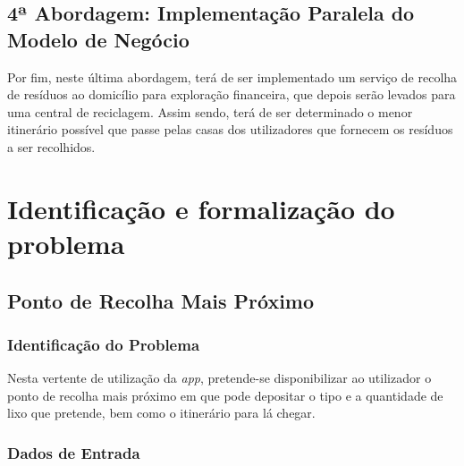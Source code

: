 \documentclass[article, a4paper, 12pt, oneside]{memoir}
\begin{document}
\section[4ª Abordagem: Implementação Paralela do Modelo de Negócio][4ª Abordagem: Implementação Paralela do Modelo de Negócio]{4ª Abordagem: Implementação Paralela do Modelo de Negócio} \label{\thesection}
	
	Por fim, neste última abordagem, terá de ser implementado um serviço de recolha de resíduos ao domicílio para exploração financeira, que depois serão levados para uma central de reciclagem. Assim sendo, terá de ser determinado o menor itinerário possível que passe pelas casas dos utilizadores que fornecem os resíduos a ser recolhidos.



\newpage
\chapter[Identificação e formalização do problema][Identificação e formalização do problema]{Identificação e formalização do problema} \label{\thechapter}

\section{Ponto de Recolha Mais Próximo}

\subsection{Identificação do Problema}

Nesta vertente de utilização da \textit{app}, pretende-se disponibilizar ao utilizador o ponto de recolha mais próximo em que pode depositar o tipo e a quantidade de lixo que pretende, bem como o itinerário para lá chegar.

\subsection{Dados de Entrada}
\end{document}

